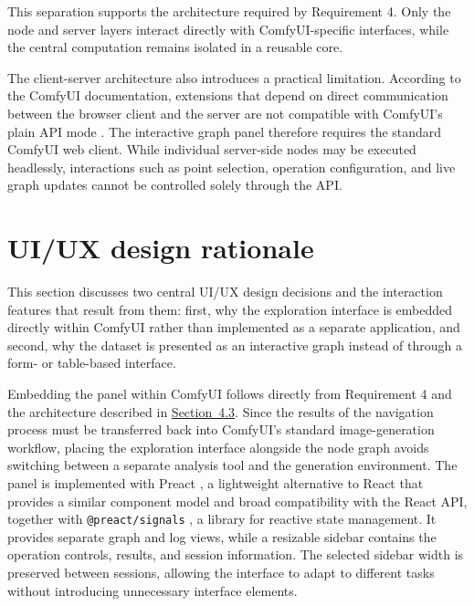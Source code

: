 This separation supports the architecture required by Requirement 4. Only the node and server layers interact directly with ComfyUI-specific interfaces, while the central computation remains isolated in a reusable core.

The client-server architecture also introduces a practical limitation. According to the ComfyUI documentation, extensions that depend on direct communication between the browser client and the server are not compatible with ComfyUI's plain API mode \cite{comfyorg2026overview}. The interactive graph panel therefore requires the standard ComfyUI web client. While individual server-side nodes may be executed headlessly, interactions such as point selection, operation configuration, and live graph updates cannot be controlled solely through the API.

\section{UI/UX design rationale}\label{sec:4.4}

This section discusses two central UI/UX design decisions and the interaction features that result from them: first, why the exploration interface is embedded directly within ComfyUI rather than implemented as a separate application, and second, why the dataset is presented as an interactive graph instead of through a form- or table-based interface.

Embedding the panel within ComfyUI follows directly from Requirement 4 and the architecture described in \hyperref[sec:4.3]{Section~4.3}. Since the results of the navigation process must be transferred back into ComfyUI's standard image-generation workflow, placing the exploration interface alongside the node graph avoids switching between a separate analysis tool and the generation environment. The panel is implemented with Preact \cite{preactjs2026core}, a lightweight alternative to React that provides a similar component model and broad compatibility with the React API, together with \texttt{@preact/signals} \cite{preactjs2026signals}, a library for reactive state management. It provides separate graph and log views, while a resizable sidebar contains the operation controls, results, and session information. The selected sidebar width is preserved between sessions, allowing the interface to adapt to different tasks without introducing unnecessary interface elements.

